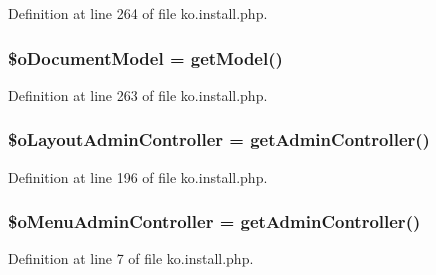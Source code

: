 Definition at line 264 of file ko.\+install.\+php.

\hypertarget{ko_8install_8php_afb18aa87e5520385e76377e876e042af}{}
\subsubsection[{\$o\+Document\+Model}]{\setlength{\rightskip}{0pt plus 5cm}\$o\+Document\+Model = {\bf get\+Model}(\textquotesingle{})}\label{ko_8install_8php_afb18aa87e5520385e76377e876e042af}


Definition at line 263 of file ko.\+install.\+php.

\hypertarget{ko_8install_8php_a6a03496003da7df71cf94d9accb430be}{}
\subsubsection[{\$o\+Layout\+Admin\+Controller}]{\setlength{\rightskip}{0pt plus 5cm}\$o\+Layout\+Admin\+Controller = {\bf get\+Admin\+Controller}(\textquotesingle{})}\label{ko_8install_8php_a6a03496003da7df71cf94d9accb430be}


Definition at line 196 of file ko.\+install.\+php.

\hypertarget{ko_8install_8php_a9062530c3b03479ca4530daee1c18887}{}
\subsubsection[{\$o\+Menu\+Admin\+Controller}]{\setlength{\rightskip}{0pt plus 5cm}\$o\+Menu\+Admin\+Controller = {\bf get\+Admin\+Controller}(\textquotesingle{})}\label{ko_8install_8php_a9062530c3b03479ca4530daee1c18887}


Definition at line 7 of file ko.\+install.\+php.

\hypertarget{ko_8install_8php_a9fd93f6625cec4fd65bf6f412e28c015}{}
